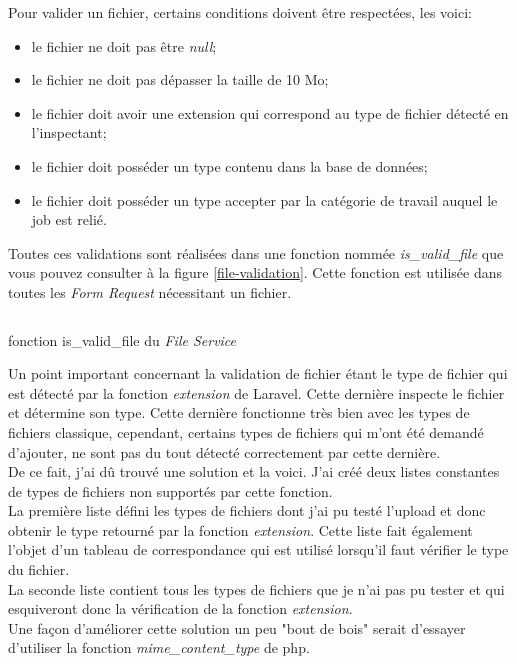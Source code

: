\documentclass[
    iai, %
    il, %
]{heig-tb}
\begin{document}
Pour valider un fichier, certains conditions doivent être respectées, les voici:
\begin{itemize}
    \item le fichier ne doit pas être \emph{null};
    \item le fichier ne doit pas dépasser la taille de 10 Mo;
    \item le fichier doit avoir une extension qui correspond au type de fichier détecté en l'inspectant;
    \item le fichier doit posséder un type contenu dans la base de données;
    \item le fichier doit posséder un type accepter par la catégorie de travail auquel le job est relié.
\end{itemize}

Toutes ces validations sont réalisées dans une fonction nommée \emph{is\_valid\_file} que vous pouvez consulter à la figure \ref{file-validation}. Cette fonction est utilisée dans toutes les \emph{Form Request} nécessitant un fichier.

\begin{listing}[H]
    \inputminted{php}{assets/code/FileValidation.php}
    \caption{fonction is\_valid\_file du \emph{File Service} \label{file-validation}}
\end{listing}

Un point important concernant la validation de fichier étant le type de fichier qui est détecté par la fonction \emph{extension} de Laravel. Cette dernière inspecte le fichier et détermine son type. Cette dernière fonctionne très bien avec les types de fichiers classique, cependant, certains types de fichiers qui m'ont été demandé d'ajouter, ne sont pas du tout détecté correctement par cette dernière. \\
De ce fait, j'ai dû trouvé une solution et la voici. J'ai créé deux listes constantes de types de fichiers non supportés par cette fonction. \\
La première liste défini les types de fichiers dont j'ai pu testé l'upload et donc obtenir le type retourné par la fonction \emph{extension}. Cette liste fait également l'objet d'un tableau de correspondance qui est utilisé lorsqu'il faut vérifier le type du fichier. \\
La seconde liste contient tous les types de fichiers que je n'ai pas pu tester et qui esquiveront donc la vérification de la fonction \emph{extension}. \\
Une façon d'améliorer cette solution un peu "bout de bois" serait d'essayer d'utiliser la fonction \emph{mime\_content\_type} de \Gls{php}.
\end{document}
